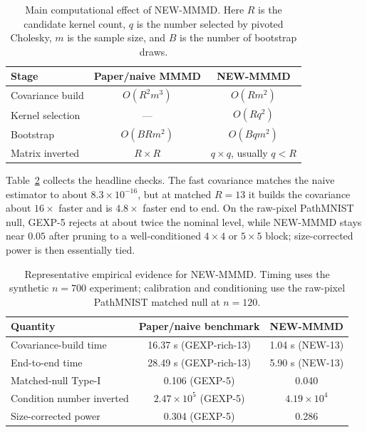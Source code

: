\documentclass[12pt]{article}
\begin{document}
\begin{table}[H]
\centering
\caption{Main computational effect of NEW-MMMD. Here $R$ is the candidate kernel count, $q$ is the number selected by pivoted Cholesky, $m$ is the sample size, and $B$ is the number of bootstrap draws.}
\label{tab:newmmmd-main-complexity}
\scriptsize
\begin{tabular}{lcc}
\toprule
Stage & Paper/naive MMMD & NEW-MMMD \\
\midrule
Covariance build & $O(R^2m^3)$ & $O(Rm^2)$ \\
Kernel selection & --- & $O(Rq^2)$ \\
Bootstrap & $O(BRm^2)$ & $O(Bqm^2)$ \\
Matrix inverted & $R\times R$ & $q\times q$, usually $q<R$ \\
\bottomrule
\end{tabular}
\end{table}

Table~\ref{tab:newmmmd-main-evidence} collects the headline checks. The fast covariance matches the naive estimator to about $8.3\times10^{-16}$, but at matched $R=13$ it builds the covariance about $16\times$ faster and is $4.8\times$ faster end to end. On the raw-pixel PathMNIST null, GEXP-5 rejects at about twice the nominal level, while NEW-MMMD stays near $0.05$ after pruning to a well-conditioned $4\times4$ or $5\times5$ block; size-corrected power is then essentially tied.

\begin{table}[H]
\centering
\caption{Representative empirical evidence for NEW-MMMD. Timing uses the synthetic $n=700$ experiment; calibration and conditioning use the raw-pixel PathMNIST matched null at $n=120$.}
\label{tab:newmmmd-main-evidence}
\scriptsize
\setlength{\tabcolsep}{5pt}
\begin{tabular}{lcc}
\toprule
Quantity & Paper/naive benchmark & NEW-MMMD \\
\midrule
Covariance-build time & 16.37 s (GEXP-rich-13) & 1.04 s (NEW-13) \\
End-to-end time & 28.49 s (GEXP-rich-13) & 5.90 s (NEW-13) \\
Matched-null Type-I & 0.106 (GEXP-5) & 0.040 \\
Condition number inverted & $2.47\times10^5$ (GEXP-5) & $4.19\times10^4$ \\
Size-corrected power & 0.304 (GEXP-5) & 0.286 \\
\bottomrule
\end{tabular}
\end{table}
\end{document}
